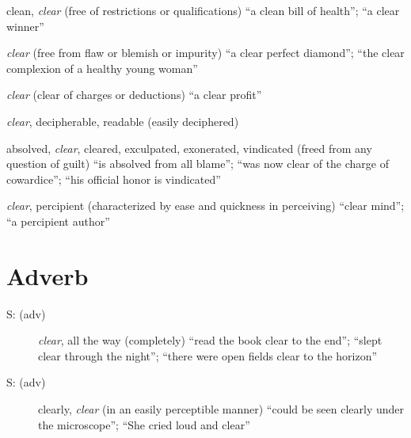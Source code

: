 \begin{description}[leftmargin=1.5cm]
  \item [S: (adj)] clean, \emph{clear} (free of restrictions or qualifications) ``a clean bill of health''; ``a clear winner''
  \item [S: (adj)] \emph{clear} (free from flaw or blemish or impurity) ``a clear perfect diamond''; ``the clear complexion of a healthy young woman''
  \item [S: (adj)] \emph{clear} (clear of charges or deductions) ``a clear profit''
  \item [S: (adj)] \emph{clear}, decipherable, readable (easily deciphered) 
  \item [S: (adj)] absolved, \emph{clear}, cleared, exculpated, exonerated, vindicated (freed from any question of guilt) ``is absolved from all blame''; ``was now clear of the charge of cowardice''; ``his official honor is vindicated''
  \item [S: (adj)] \emph{clear}, percipient (characterized by ease and quickness in perceiving) ``clear mind''; ``a percipient author''
\end{description}


\section{Adverb}
\begin{description}
  \item [S: (adv)] \emph{clear}, all the way (completely) ``read the book clear to the end''; ``slept clear through the night''; ``there were open fields clear to the horizon''
  \item [S: (adv)] clearly, \emph{clear} (in an easily perceptible manner) ``could be seen clearly under the microscope''; ``She cried loud and clear''
\end{description}